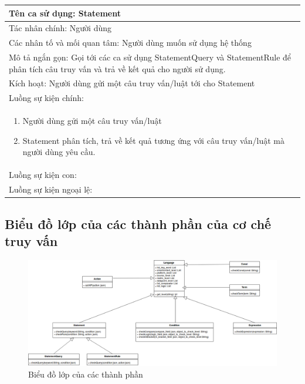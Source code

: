 \begin{longtable}{|p{140mm}|}
\hline
Tên ca sử dụng: Statement\\
\hline
Tác nhân chính: Người dùng\\
\hline
Các nhân tố và mối quan tâm: Người dùng muốn sử dụng hệ thống\\
\hline
Mô tả ngắn gọn: Gọi tới các ca sử dụng StatementQuery và StatementRule để phân tích câu truy vấn và trả về kết quả cho người sử dụng.\\
\hline
Kích hoạt: Người dùng gửi một câu truy vấn/luật tới cho Statement\\
\hline
Luồng sự kiện chính: \\
\begin{enumerate}
	\item Người dùng gửi một câu truy vấn/luật 
	\item Statement phân tích, trả về kết quả tương ứng với câu truy vấn/luật mà người dùng yêu cầu.
\end{enumerate}\\
\hline
Luồng sự kiện con: \\
\hline 
Luồng sự kiện ngoại lệ: \\
\hline
\end{longtable}

\clearpage

\subsection{Biểu đồ lớp của các thành phần của cơ chế truy vấn}

\begin{figure}[h!]
	\center
	\includegraphics[scale=0.35]{image/language_diagram-class_diagram}	
	\caption{Biểu đồ lớp của các thành phần}
\end{figure}

